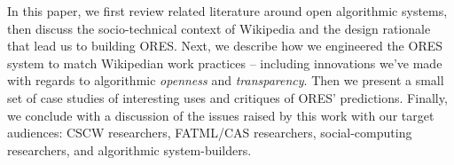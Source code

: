 In this paper, we first review related literature around open algorithmic systems, then discuss the socio-technical context of Wikipedia and the design rationale that lead us to building ORES.  Next, we describe how we engineered the ORES system to match Wikipedian work practices -- including innovations we've made with regards to algorithmic \emph{openness} and \emph{transparency}.  Then we present a small set of case studies of interesting uses and critiques of ORES' predictions.  Finally, we conclude with a discussion of the issues raised by this work with our target audiences: CSCW researchers, FATML/CAS researchers, social-computing researchers, and algorithmic system-builders.
